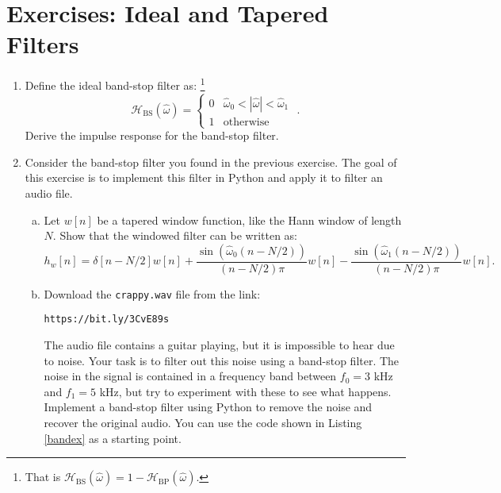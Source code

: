 
\newpage
\section{Exercises: Ideal and Tapered Filters}

\begin{enumerate}
  \item Define the ideal band-stop filter as: \footnote{That is $\mathcal{H}_{\mathrm{BS}}(\hat{\omega})=1 - \mathcal{H}_{\mathrm{BP}}(\hat{\omega})$.}
        \begin{equation}
          \mathcal{H}_{\mathrm{BS}}(\hat{\omega}) = \left\{ \begin{array}{cc}
            0 & \hat{\omega}_0 < |\hat{\omega}| < \hat{\omega}_1 \\
            1 & \mathrm{otherwise}
          \end{array}\right.\,\,.
        \end{equation}
        Derive the impulse response for the band-stop filter.

  \item Consider the band-stop filter you found in the previous exercise.
        The goal of this exercise is to implement this filter in Python and apply it to filter an audio file.

        \begin{enumerate}[a)]
          \item Let $w[n]$ be a tapered window function, like the Hann window of length $N$. Show that the windowed filter can be written as:
                \[ h_{w}[n]=\delta[n-N/2]w[n] + \frac{\sin(\hat{\omega}_{0}(n-N/2))}{(n-N/2)\pi}w[n] - \frac{\sin(\hat{\omega}_{1}(n-N/2))}{(n-N/2)\pi}w[n]. \]

          \item Download the \verb|crappy.wav| file from the link:
                \begin{center}
                  \verb|https://bit.ly/3CvE89s|
                \end{center}
                The audio file contains a guitar playing, but it is impossible to hear due to noise.
                Your task is to filter out this noise using a band-stop filter.
                The noise in the signal is contained in a frequency band between $f_{0}=3$ kHz and $f_{1}=5$ kHz,
                but try to experiment with these to see what happens. Implement a band-stop filter using
                Python to remove the noise and recover the original audio. You can use the code shown in Listing \ref{bandex}
                as a starting point.
        \end{enumerate}

        

\end{enumerate}
